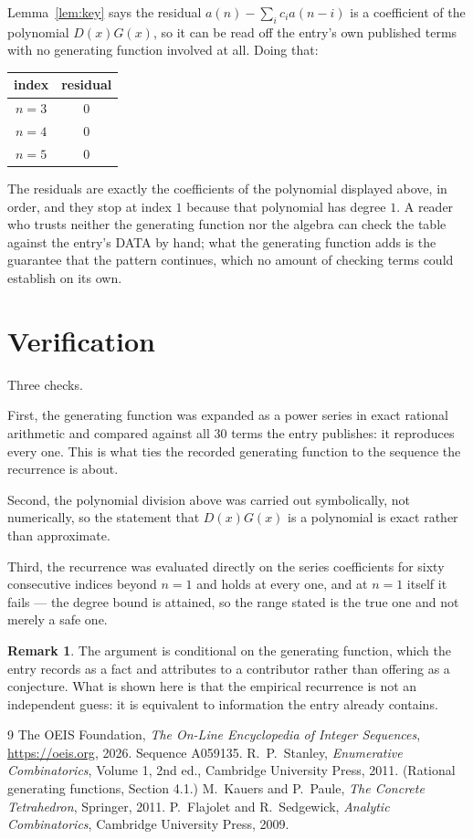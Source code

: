 \documentclass[11pt,a4paper]{article}
\theoremstyle{plain}
\theoremstyle{definition}
\newtheorem{remark}[theorem]{Remark}
\begin{document}
Lemma~\ref{lem:key} says the residual $a(n)-\sum_ic_ia(n-i)$ is a coefficient of the
polynomial $D(x)G(x)$, so it can be read off the entry's own published terms with no
generating function involved at all. Doing that:
\begin{center}
\begin{tabular}{cc}
index & residual \\ \hline
$n=3$ & $0$ \\
$n=4$ & $0$ \\
$n=5$ & $0$
\end{tabular}
\end{center}
The residuals are exactly the coefficients of the polynomial displayed above, in order, and
they stop at index $1$ because that polynomial has degree $1$. A reader who trusts
neither the generating function nor the algebra can check the table against the entry's DATA
by hand; what the generating function adds is the guarantee that the pattern continues, which
no amount of checking terms could establish on its own.

\section{Verification}

Three checks.

First, the generating function was expanded as a power series in exact rational arithmetic and
compared against all $30$ terms the entry publishes: it reproduces every one. This is
what ties the recorded generating function to the sequence the recurrence is about.

Second, the polynomial division above was carried out symbolically, not numerically, so the
statement that $D(x)G(x)$ is a polynomial is exact rather than approximate.

Third, the recurrence was evaluated directly on the series coefficients for sixty consecutive
indices beyond $n=1$ and holds at every one, and at $n=1$ itself it fails --- the
degree bound is attained, so the range stated is the true one and not merely a safe one.

\begin{remark}
The argument is conditional on the generating function, which the entry records as a fact and
attributes to a contributor rather than offering as a conjecture. What is shown here is that
the empirical recurrence is not an independent guess: it is equivalent to information the
entry already contains.
\end{remark}

\begin{thebibliography}{9}
 The OEIS Foundation, \emph{The On-Line Encyclopedia of Integer
Sequences}, \url{https://oeis.org}, 2026. Sequence A059135.
 R.~P.~Stanley, \emph{Enumerative Combinatorics}, Volume 1, 2nd ed.,
Cambridge University Press, 2011. (Rational generating functions, Section 4.1.)
 M.~Kauers and P.~Paule, \emph{The Concrete Tetrahedron}, Springer, 2011.
 P.~Flajolet and R.~Sedgewick, \emph{Analytic Combinatorics}, Cambridge
University Press, 2009.
\end{thebibliography}
\end{document}

